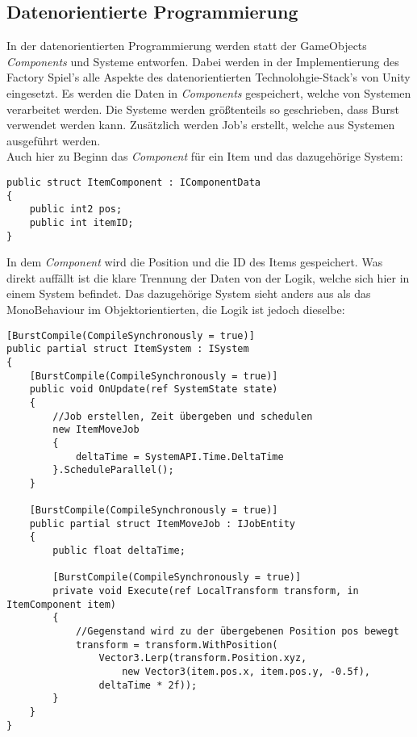 \subsection{Datenorientierte Programmierung}
In der datenorientierten Programmierung werden statt der GameObjects \textit{Components} und Systeme entworfen. Dabei werden in der Implementierung des Factory Spiel's alle Aspekte des datenorientierten Technolohgie-Stack's von Unity eingesetzt. Es werden die Daten in \textit{Components} gespeichert, welche von Systemen verarbeitet werden. Die Systeme werden größtenteils so geschrieben, dass Burst verwendet werden kann. Zusätzlich werden Job's erstellt, welche aus Systemen ausgeführt werden.\\
Auch hier zu Beginn das \textit{Component} für ein Item und das dazugehörige System:
\begin{lstlisting}[style=code, caption={Item Component ECS}, label=itemComponent]
public struct ItemComponent : IComponentData
{
    public int2 pos;
    public int itemID;
}
\end{lstlisting}
In dem \textit{Component} wird die Position und die ID des Items gespeichert. Was direkt auffällt ist die klare Trennung der Daten von der Logik, welche sich hier in einem System befindet. Das dazugehörige System sieht anders aus als das MonoBehaviour im Objektorientierten, die Logik ist jedoch dieselbe:
\begin{lstlisting}[style=code, caption={Item System und Job zum Bewegen von Items}]
[BurstCompile(CompileSynchronously = true)]
public partial struct ItemSystem : ISystem
{
    [BurstCompile(CompileSynchronously = true)]
    public void OnUpdate(ref SystemState state)
    {
    	//Job erstellen, Zeit übergeben und schedulen
        new ItemMoveJob
        {
            deltaTime = SystemAPI.Time.DeltaTime
        }.ScheduleParallel();
    }

    [BurstCompile(CompileSynchronously = true)]
    public partial struct ItemMoveJob : IJobEntity
    {
        public float deltaTime;
        
        [BurstCompile(CompileSynchronously = true)]
        private void Execute(ref LocalTransform transform, in ItemComponent item)
        {
        	//Gegenstand wird zu der übergebenen Position pos bewegt
            transform = transform.WithPosition(
                Vector3.Lerp(transform.Position.xyz,
                    new Vector3(item.pos.x, item.pos.y, -0.5f),
                deltaTime * 2f));
        }
    }
}
\end{lstlisting}
